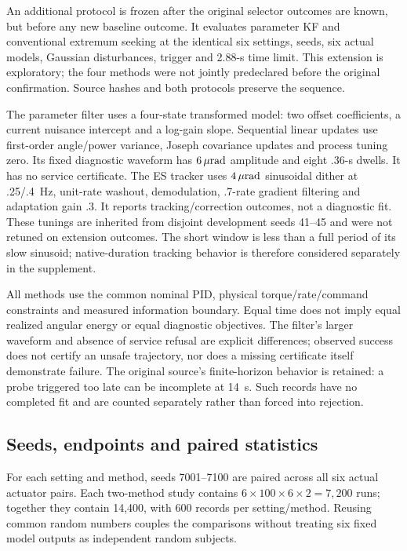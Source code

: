An additional protocol is frozen after the original selector outcomes are known, but before any new baseline outcome. It evaluates parameter KF and conventional extremum seeking at the identical six settings, seeds, six actual models, Gaussian disturbances, trigger and 2.88-s time limit. This extension is exploratory; the four methods were not jointly predeclared before the original confirmation. Source hashes and both protocols preserve the sequence.

The parameter filter uses a four-state transformed model: two offset coefficients, a current nuisance intercept and a log-gain slope. Sequential linear updates use first-order angle/power variance, Joseph covariance updates and process tuning zero. Its fixed diagnostic waveform has $6\,\mu\mathrm{rad}$ amplitude and eight .36-s dwells. It has no service certificate. The ES tracker uses $4\,\mu\mathrm{rad}$ sinusoidal dither at .25/.4~Hz, unit-rate washout, demodulation, .7-rate gradient filtering and adaptation gain .3. It reports tracking/correction outcomes, not a diagnostic fit. These tunings are inherited from disjoint development seeds 41--45 and were not retuned on extension outcomes. The short window is less than a full period of its slow sinusoid; native-duration tracking behavior is therefore considered separately in the supplement.

All methods use the common nominal PID, physical torque/rate/command constraints and measured information boundary. Equal time does not imply equal realized angular energy or equal diagnostic objectives. The filter's larger waveform and absence of service refusal are explicit differences; observed success does not certify an unsafe trajectory, nor does a missing certificate itself demonstrate failure. The original source's finite-horizon behavior is retained: a probe triggered too late can be incomplete at 14~s. Such records have no completed fit and are counted separately rather than forced into rejection.

\subsection{Seeds, endpoints and paired statistics}
For each setting and method, seeds 7001--7100 are paired across all six actual actuator pairs. Each two-method study contains $6\times100\times6\times2=7,200$ runs; together they contain 14,400, with 600 records per setting/method. Reusing common random numbers couples the comparisons without treating six fixed model outputs as independent random subjects.

